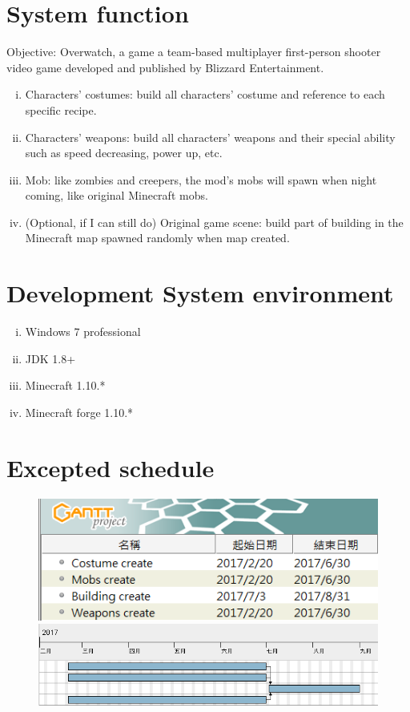 \documentclass[12pt]{article}
\newcommand\tab[1][1cm]{\hspace*{#1}}
\begin{document}
\begin{CJK}{UTF8}{bkai}
	\section{System function}
	\tab Objective: Overwatch, a game a team-based multiplayer first-person shooter video game developed and published by Blizzard Entertainment.\\
	\begin{enumerate}[i.]
		\item Characters' costumes: build all characters' costume and reference to each specific recipe.
		\item Characters' weapons: build all characters' weapons and their special ability such as speed decreasing, power up, etc.
		\item Mob: like zombies and creepers, the mod's mobs will spawn when night coming, like original Minecraft mobs.
		\item (Optional, if I can still do) Original game scene: build part of building in the Minecraft map spawned randomly when map created.
	\end{enumerate}
	\section{Development System environment}
	\begin{enumerate}[i.]
		\item Windows 7 professional
		\item JDK 1.8+
		\item Minecraft 1.10.*
		\item Minecraft forge 1.10.*
	\end{enumerate}
	\section{Excepted schedule}
	\begin{figure}[h]
	\includegraphics[width=\textwidth]{Mod-1}\\
	\includegraphics[width=\textwidth]{Mod-2}
	\end{figure}

\end{CJK}
\end{document}
